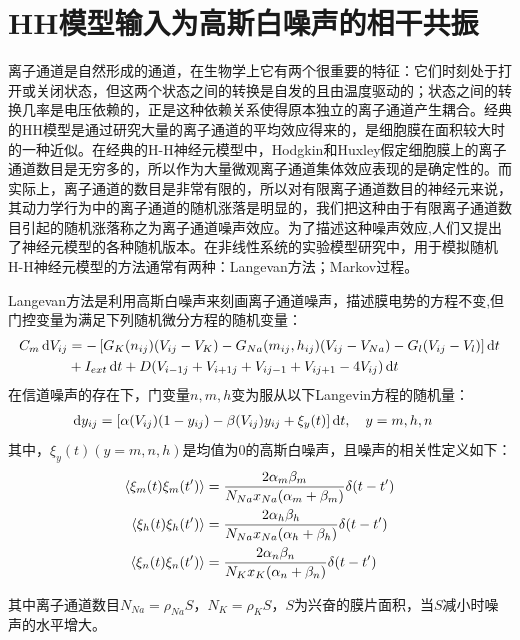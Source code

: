 \documentclass[
bachelor,
nofont, %
pdflinks,
]{xjtuthesis}
\begin{document}
\section{HH模型输入为高斯白噪声的相干共振}

离子通道是自然形成的通道，在生物学上它有两个很重要的特征：它们时刻处于打开或关闭状态，但这两个状态之间的转换是自发的且由温度驱动的；状态之间的转换几率是电压依赖的，正是这种依赖关系使得原本独立的离子通道产生耦合。经典的HH模型是通过研究大量的离子通道的平均效应得来的，是细胞膜在面积较大时的一种近似。在经典的H-H神经元模型中，Hodgkin和Huxley假定细胞膜上的离子通道数目是无穷多的，所以作为大量微观离子通道集体效应表现的是确定性的。而实际上，离子通道的数目是非常有限的，所以对有限离子通道数目的神经元来说，其动力学行为中的离子通道的随机涨落是明显的，我们把这种由于有限离子通道数目引起的随机涨落称之为离子通道噪声效应。为了描述这种噪声效应,人们又提出了神经元模型的各种随机版本。在非线性系统的实验模型研究中，用于模拟随机H-H神经元模型的方法通常有两种：Langevan方法；Markov过程。

\medskip

Langevan方法是利用高斯白噪声来刻画离子通道噪声，描述膜电势的方程不变,但门控变量为满足下列随机微分方程的随机变量：
\begin{align}
\notag C_m \,\mathrm d V_{ij} &= -\left[G_{K} (n_{ij})(V_{ij}-V_{K}) - G_{Na}(m_{ij},h_{ij})(V_{ij}-V_{Na}) - G_{l} (V_{ij}-V_{l})\right] \mathrm d t \\
&+ I_{ext} \,\mathrm d t + D(V_{i-1j}+V_{i+1j}+V_{ij-1}+V_{ij+1}-4V_{ij}) \,\mathrm d t
\end{align}
在信道噪声的存在下，门变量$n,m,h$变为服从以下Langevin方程的随机量：
\begin{align}
\mathrm d y_{ij} &= \left[\alpha (V_{ij})(1-y_{ij})-\beta (V_{ij})y_{ij} + \xi_y(t) \right] \mathrm d t, \quad y=m,h,n
\end{align}
其中，$\xi_y(t)(y=m,n,h)$是均值为0的高斯白噪声，且噪声的相关性定义如下：
\begin{align}
\notag \left \langle \xi_m(t)\xi_m(t') \right \rangle &= \dfrac{2\alpha_m \beta_m}{N_{Na}x_{Na}(\alpha_m+ \beta_m)} \delta(t-t') \\
\left \langle \xi_h(t)\xi_h(t') \right \rangle &=\dfrac{2\alpha_h \beta_h}{N_{Na}x_{Na}(\alpha_h+ \beta_h)} \delta(t-t') \\
\notag \left \langle \xi_n(t)\xi_n(t') \right \rangle &= \dfrac{2\alpha_n \beta_n}{N_{K}x_{K}(\alpha_n+ \beta_n)} \delta(t-t')
\end{align}

其中离子通道数目$N_{Na}=\rho_{Na}S$，$N_{K}=\rho_{K}S$，$S$为兴奋的膜片面积，当$S$减小时噪声的水平增大。
\end{document}

